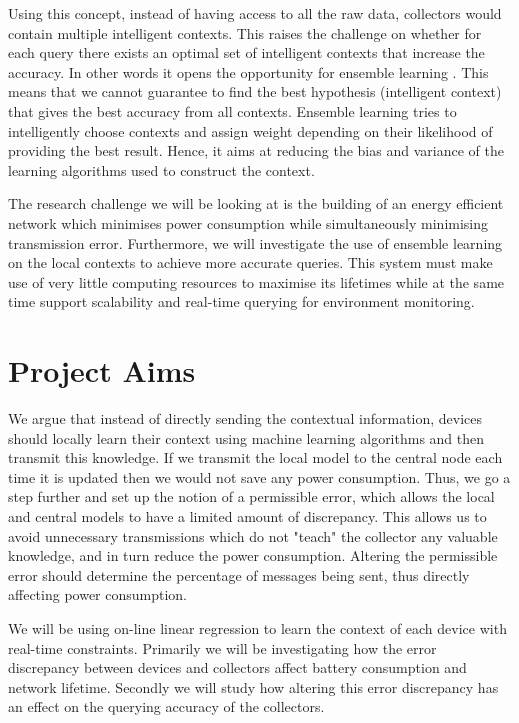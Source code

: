 \documentclass{mproj}
\begin{document}
Using this concept, instead of having access to all the raw data, collectors would contain multiple intelligent contexts. This raises the challenge on whether for each query there exists an optimal set of intelligent contexts that increase the accuracy. In other words it opens the opportunity for ensemble learning \cite{dietterich2002ensemble}. This means that we cannot guarantee to find the best hypothesis (intelligent context) that gives the best accuracy from all contexts. Ensemble learning tries to intelligently choose contexts and assign weight depending on their likelihood of providing the best result. Hence, it aims at reducing the bias and variance of the learning algorithms used to construct the context.\cite{dietterich2002ensemble}

The research challenge we will be looking at is the building of an energy efficient network which minimises power consumption while simultaneously minimising transmission error. Furthermore, we will investigate the use of ensemble learning on the local contexts to achieve more accurate queries. This system must make use of very little computing resources to maximise its lifetimes while at the same time support scalability and real-time querying for environment monitoring.

\section{Project Aims}
We argue that instead of directly sending the contextual information, devices should locally learn their context using machine learning algorithms and then transmit this knowledge. If we transmit the local model to the central node each time it is updated then we would not save any power consumption. Thus, we go a step further and set up the notion of a  permissible error, which allows the local and central models to have a limited amount of discrepancy. This allows us to avoid unnecessary transmissions which do not "teach" the collector any valuable knowledge, and in turn reduce the power consumption. Altering the permissible error should determine the percentage of messages being sent, thus directly affecting power consumption.

We will be using on-line linear regression to learn the context of each device with real-time constraints. Primarily we will be investigating how the error discrepancy between devices and collectors affect battery consumption and network lifetime. Secondly we will study how altering this error discrepancy has an effect on the querying accuracy of the collectors.
\end{document}
